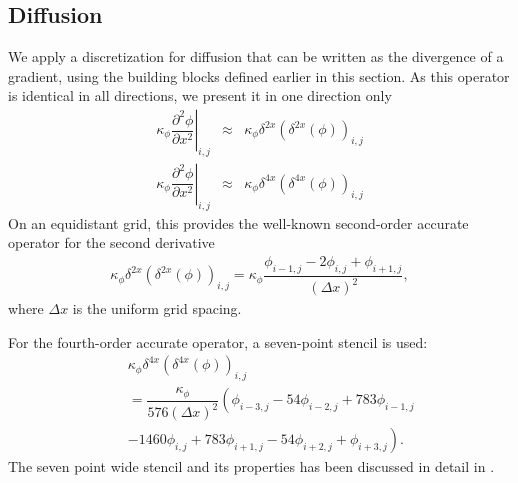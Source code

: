 \documentclass[gmd,manuscript]{copernicus}
\begin{document}
\subsection{Diffusion}
We apply a discretization for diffusion that can be written as the divergence of a gradient, using the building blocks defined earlier in this section. As this operator is identical in all directions, we present it in one direction only
\begin{eqnarray}
\left. \kappa_\phi \dfrac{\partial^2 \phi}{\partial x^2}\right|_{i,j} & \approx &
\kappa_\phi \delta^{2x} \left( \delta^{2x} \left( \phi \right) \right)_{i,j}\\
\left. \kappa_\phi \dfrac{\partial^2 \phi}{\partial x^2}\right|_{i,j} & \approx &
\kappa_\phi \delta^{4x} \left( \delta^{4x} \left( \phi \right) \right)_{i,j}
\end{eqnarray}
On an equidistant grid, this provides the well-known second-order accurate operator for the second derivative
\begin{eqnarray}
\kappa_\phi \delta^{2x} \left( \delta^{2x} \left( \phi \right) \right)_{i,j} =
\kappa_\phi \dfrac{ \phi_{i-1,j} - 2 \phi_{i,j} + \phi_{i+1,j} }{\left( \Delta x \right)^2},
\end{eqnarray}
where $\Delta x$ is the uniform grid spacing.

For the fourth-order accurate operator, a seven-point stencil is used:
\begin{eqnarray}
\nonumber
&& \kappa_\phi \delta^{4x} \left( \delta^{4x} \left( \phi \right) \right)_{i,j}\\
\nonumber
&& = \dfrac{\kappa_\phi}{576 \left( \Delta x \right)^2} \left( \phi_{i-3,j} - 54 \phi_{i-2,j} + 783 \phi_{i-1,j}\right.\\
&&  \left. - 1460  \phi_{i,j} + 783 \phi_{i+1,j} - 54 \phi_{i+2,j} + \phi_{i+3,j} \right).
\end{eqnarray}
The seven point wide stencil and its properties has been discussed in detail in \citet{Castillo1995}.
\end{document}
